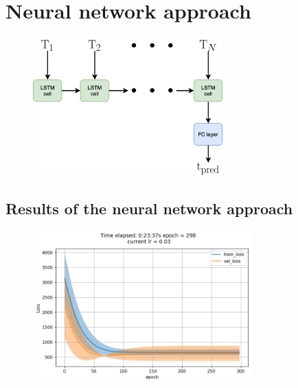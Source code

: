 \documentclass[11pt, a4paper]{article}
\begin{document}
\newpage
\section*{Neural network approach}
\begin{figure}[H]
    \centering
    \includegraphics[width=0.65\textwidth]{images/LSTM_arch.png}
\end{figure}

\subsection*{Results of the neural network approach}
\begin{figure}[H]
    \centering
    \includegraphics[width=0.75\textwidth]{images/loss-6.png}
\end{figure}
\end{document}
